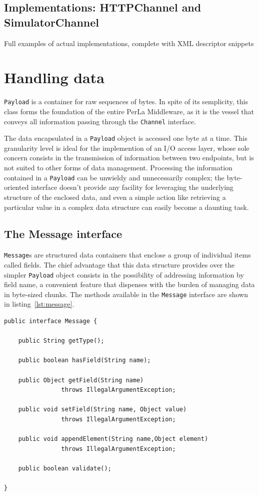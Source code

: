\subsection{Implementations: HTTPChannel and SimulatorChannel}
\label{sec:channel.implementations}

Full examples of actual implementations, complete with XML descriptor snippets


\section{Handling data}
\label{sec:components.mapper}

\texttt{Payload} is a container for raw sequences of bytes. In spite of its
semplicity, this class forms the foundation of the entire PerLa Middleware, as
it is the vessel that conveys all information passing through the
\texttt{Channel} interface.

The data encapsulated in a \texttt{Payload} object is accessed one byte at a
time. This granularity level is ideal for the implemention of an I/O access
layer, whose sole concern consists in the transmission of information between
two endpoints, but is not suited to other forms of data management. Processing
the information contained in a \texttt{Payload} can be unwieldy and
unnecessarily complex; the byte-oriented interface doesn't provide any facility
for leveraging the underlying structure of the enclosed data, and even a simple
action like retrieving a particular value in a complex data structure can
easily become a daunting task.


\subsection{The Message interface}

\texttt{Message}s are structured data containers that enclose a group of
individual items called fields. The chief advantage that this data structure
provides over the simpler \texttt{Payload} object consists in the possibility
of addressing information by field name, a convenient feature that dispenses
with the burden of managing data in byte-sized chunks. The methods available in
the \texttt{Message} interface are shown in listing~\ref{lst:message}.

\lstset{language=Java}
\begin{lstlisting}[float,floatplacement=!hbt,caption=The Message
interface,label={lst:message}]
public interface Message {

    public String getType();

    public boolean hasField(String name);

    public Object getField(String name)
                throws IllegalArgumentException;

    public void setField(String name, Object value)
                throws IllegalArgumentException;

    public void appendElement(String name,Object element)
                throws IllegalArgumentException;

    public boolean validate();

}
\end{lstlisting}

